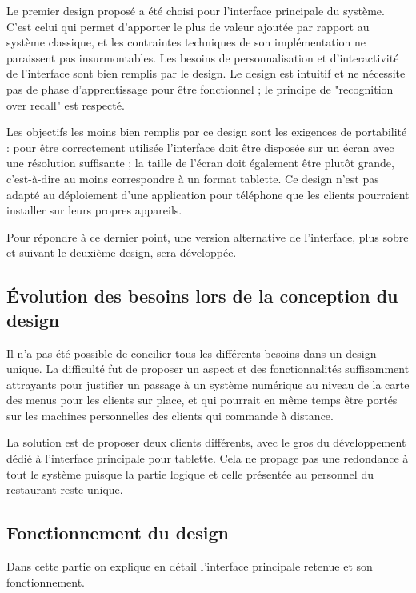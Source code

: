 \documentclass[a4paper,12pt]{article}
\begin{document}
Le premier design proposé a été choisi pour l'interface principale du système. C'est celui qui permet d'apporter le plus de valeur ajoutée par rapport au système classique, et les contraintes techniques de son implémentation ne paraissent pas insurmontables. Les besoins de personnalisation et d'interactivité de l'interface sont bien remplis par le design. Le design est intuitif et ne nécessite pas de phase d'apprentissage pour être fonctionnel ; le  principe de "recognition over recall" est respecté.

Les objectifs les moins bien remplis par ce design sont les exigences de portabilité : pour être correctement utilisée l'interface doit être disposée sur un écran avec une résolution suffisante ; la taille de l'écran doit également être plutôt grande, c'est-à-dire au moins correspondre à un format tablette. Ce design n'est pas adapté au déploiement d'une application pour téléphone que les clients pourraient installer sur leurs propres appareils.

Pour répondre à ce dernier point, une version alternative de l'interface, plus sobre et suivant le deuxième design, sera développée.

\subsection{Évolution des besoins lors de la conception du design}

Il n'a pas été possible de concilier tous les différents besoins dans un design unique. La difficulté fut de proposer un aspect et des fonctionnalités suffisamment attrayants pour justifier un passage à un système numérique au niveau de la carte des menus pour les clients sur place, et qui pourrait en même temps être portés sur les machines personnelles des clients qui commande à distance.

La solution est de proposer deux clients différents, avec le gros du développement dédié à l'interface principale pour tablette. Cela ne propage pas une redondance à tout le système puisque la partie logique et celle présentée au personnel du restaurant reste unique.

\subsection{Fonctionnement du design}

Dans cette partie on explique en détail l'interface principale retenue et son fonctionnement.
\end{document}
